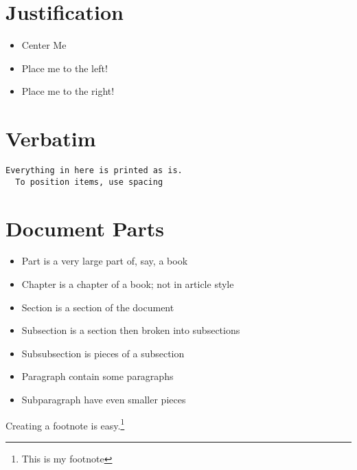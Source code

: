 \documentclass[11pt]{report}  %
\begin{document}
\section*{Justification}
\begin{itemize}
\item \begin{center} Center Me \end{center}  %
\item \begin{flushleft} Place me to the left! \end{flushleft}  %
\item \begin{flushright} Place me to the right! \end{flushright}  %

\end{itemize}

\section*{Verbatim}
\begin{verbatim}
Everything in here is printed as is.
  To position items, use spacing
\end{verbatim}

\section*{Document Parts}
\begin{itemize}
\item Part is a very large part of, say, a book
\item Chapter is a chapter of a book; not in article style
\item Section is a section of the document
\item Subsection is a section then broken into subsections
\item Subsubsection is pieces of a subsection
\item Paragraph contain some paragraphs
\item Subparagraph have even smaller pieces
\end{itemize}


Creating a footnote is easy.\footnote{This is my footnote}
\end{document}
